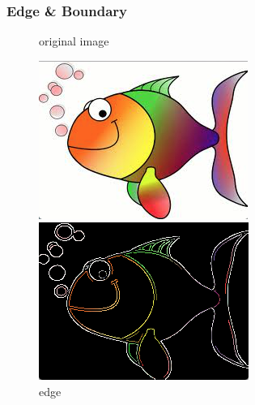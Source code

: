 \documentclass[notheorems,serif,table,compress]{beamer}  %
\begin{document}
\begin{frame}
\frametitle{Edge \& Boundary}
    \begin{tcolorbox}[colback=red!5,colframe=blue!75!black]
        \begin{figure}
            \begin{minipage}[t]{0.3\linewidth}
            \centering
            \caption{original image}
            \includegraphics[width=1\linewidth]{src.png} 
            \end{minipage}
            \begin{minipage}[t]{0.3\linewidth}
            \centering
            \caption{edge}
            \includegraphics[width=1\linewidth]{edge.png} 
            \end{minipage}

\end{figure}
\end{tcolorbox}
\end{frame}
\end{document}
